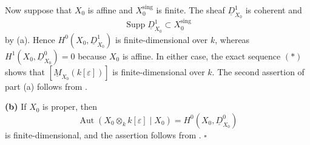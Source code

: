 Now suppose that $X_0$ is affine and $X_0^{\mathrm{sing}}$ is finite.
The sheaf $\underline D^1_{X_0}$ is coherent and
\[
\operatorname{Supp}\underline D^1_{X_0}
\subset X_0^{\mathrm{sing}}
\]
by (a). Hence $H^0(X_0,\underline D^1_{X_0})$ is
finite-dimensional over $k$, whereas
$H^1(X_0,\underline D^0_{X_0})=0$ because $X_0$ is affine. In either
case, the exact sequence $(*)$ shows that
$[\underline M_{X_0}(k[\varepsilon])]$ is finite-dimensional over
$k$. The second assertion of part (a) follows from .

\smallskip
\noindent\textbf{(b)} If $X_0$ is proper, then
\[
\operatorname{Aut}(X_0\otimes_k k[\varepsilon]\mid X_0)
=H^0(X_0,\underline D^0_{X_0})
\]
is finite-dimensional, and the assertion follows from .
\hfill$\square$
